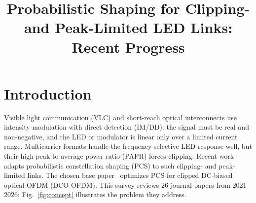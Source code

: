 \documentclass[conference]{IEEEtran}
\begin{document}
\title{Probabilistic Shaping for Clipping- and Peak-Limited LED Links: Recent Progress}
\author{
}
\maketitle


\section{Introduction}
Visible light communication (VLC) and short-reach optical interconnects use intensity modulation with direct detection (IM/DD): the signal must be real and non-negative, and the LED or modulator is linear only over a limited current range. Multicarrier formats handle the frequency-selective LED response well, but their high peak-to-average power ratio (PAPR) forces clipping. Recent work adapts probabilistic constellation shaping (PCS) to such clipping- and peak-limited links. The chosen base paper~\cite{pham2026} optimizes PCS for clipped DC-biased optical OFDM (DCO-OFDM). This survey reviews 26 journal papers from 2021--2026; Fig.~\ref{fig:concept} illustrates the problem they address.
\end{document}
